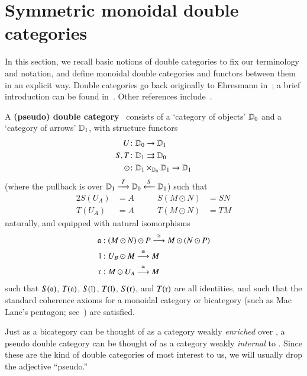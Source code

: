 \section{Symmetric monoidal double categories}
\label{sec:symm-mono-double}

In this section, we recall basic notions of double categories to fix our terminology and notation, and define monoidal double categories and functors between them in an explicit way.
Double categories go back originally to Ehresmann
in~\cite{ehresmann:cat-str}; a brief introduction can be found
in~\cite{ks:r2cats}.  Other references
include~\cite{multi_funct_i,gp:double-limits,gp:double-adjoints,aleiferi2018cartesian}.


\begin{defn}\label{def:dblcat}
  A \textbf{(pseudo) double category} \lD\ consists of a `category of
  objects' $\lD_0$ and a `category of arrows' $\lD_1$, with structure
  functors
  \begin{align*}
    U&\maps \lD_0\to \lD_1\\
    S,T&\maps \lD_1\rightrightarrows \lD_0\\
    \odot&\maps \lD_1\times_{\lD_0}\lD_1\to \lD_1
  \end{align*}
  (where the pullback is over
  $\lD_1\too[T]\lD_0\overset{S}{\longleftarrow} \lD_1$) such that
  \begin{alignat*}{2}
    S(U_A) &= A &\qquad
    S(M\odot N) &= SN\\
    T(U_A) &= A &\qquad
    T(M\odot N) &= TM
  \end{alignat*}
  naturally, and equipped with natural isomorphisms
  \begin{align*}
    \fa &: (M\odot N) \odot P \too[\iso] M \odot (N \odot P)\\
    \fl &: U_B \odot M \too[\iso] M\\
    \fr &: M \odot U_A \too[\iso] M
  \end{align*}
  such that $S(\fa)$, $T(\fa)$, $S(\fl)$, $T(\fl)$, $S(\fr)$, and
  $T(\fr)$ are all identities, and such that the standard coherence
  axioms for a monoidal category or bicategory (such as Mac Lane's
  pentagon; see~\cite{maclane}) are satisfied.
\end{defn}

Just as a bicategory can be thought of as a category weakly
\emph{enriched} over \cCat, a pseudo double category can be thought of
as a category weakly \emph{internal} to \cCat.  Since these are the
kind of double categories of most interest to us, we will usually drop
the adjective ``pseudo.''

